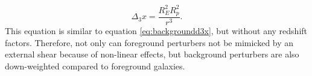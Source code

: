 \begin{equation}
\Delta_3 x = \frac{R_E^2 R_p^2}{r^3}.
\end{equation}
This equation is similar to equation \ref{eq:backgroundd3x}, but without any redshift factors. Therefore, not only can foreground perturbers not be mimicked by an external shear because of non-linear effects, but background perturbers are also down-weighted compared to foreground galaxies.
  
  